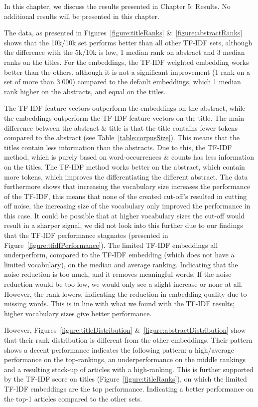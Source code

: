 \documentclass[../../Thesis.tex]{subfiles}
\begin{document}
In this chapter, we discuss the results presented in Chapter 5: Results. No additional results will be presented in this chapter.

The data, as presented in Figures~\ref{figure:titleRanks} \&~\ref{figure:abstractRanks} shows that the 10k/10k set performs better than all other TF-IDF sets, although the difference with the 5k/10k is low, 1  median rank on abstract and 3 median ranks on the titles. For the embeddings, the TF-IDF weighted embedding works better than the others, although it is not a significant improvement (1 rank on a set of more than 3.000) compared to the default embeddings, which 1 median rank higher on the abstracts, and equal on the titles. 

The TF-IDF feature vectors outperform the embeddings on the abstract, while the embeddings outperform the TF-IDF feature vectors on the title. The main difference between the abstract \& title is that the title contains fewer tokens compared to the abstract (see Table~\ref{table:corpusSize}). This means that the titles contain less information than the abstracts. Due to this, the TF-IDF method, which is purely based on word-occurrences \& counts has less information on the titles. The TF-IDF method works better on the abstract, which contain more tokens, which improves the differentiating the different abstract. The data furthermore shows that increasing the vocabulary size increases the performance of the TF-IDF, this means that none of the created cut-off's resulted in cutting off noise, the increasing size of the vocabulary only improved the performance in this case. It could be possible that at higher vocabulary sizes the cut-off would result in a sharper signal, we did not look into this further due to our findings that the TF-IDF performance stagnates (presented in Figure~\ref{figure:tfidfPerformance}).
\clearpage
{}
The limited TF-IDF embeddings all underperform, compared to the TF-IDF embedding (which does not have a limited vocabulary), on the median and average ranking. Indicating that the noise reduction is too much, and it removes meaningful words. If the noise reduction would be too low, we would only see a slight increase or none at all. However, the rank lowers, indicating the reduction in embedding quality due to missing words. This is in line with what we found with the TF-IDF results; higher vocabulary sizes give better performance. 
\begin{jumpin}
However, Figures~\ref{figure:titleDistribution} \&~\ref{figure:abstractDistribution} show that their rank distribution is different from the other embeddings. Their pattern shows a decent performance indicates the following pattern: a high/average performance on the top-rankings, an underperformance on the middle rankings and a resulting stack-up of articles with a high-ranking. This is further supported by the TF-IDF score on titles (Figure~\ref{figure:titleRanks}), on which the limited TF-IDF embeddings are the top performance. Indicating a better performance on the top-1 articles compared to the other sets.\vspace{0.3in}
\end{jumpin}
\end{document}
